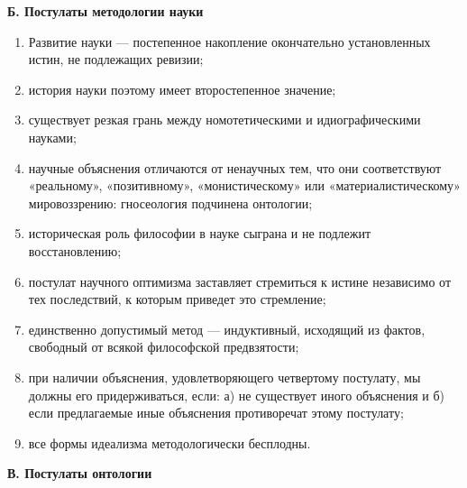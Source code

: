 \begin{center}
  \textbf{Б. Постулаты методологии науки}
\end{center}

\begin{enumerate}

  \item Развитие науки --- постепенное накопление окончательно
        установленных истин, не подлежащих ревизии;

  \item история науки поэтому имеет второстепенное значение;

  \item существует резкая грань между номотетическими и
        идиографическими науками;

  \item научные объяснения отличаются от ненаучных тем, что они
        соответствуют «реальному», «позитивному», «монистическому»
        или «материалистическому» мировоззрению: гносеология
        подчинена онтологии;

  \item историческая роль философии в науке сыграна и не подлежит
        восстановлению;

  \item постулат научного оптимизма заставляет стремиться к истине
        независимо от тех последствий, к которым приведет это
        стремление;

  \item единственно допустимый метод --- индуктивный, исходящий из
        фактов, свободный от всякой философской предвзятости;

  \item при наличии объяснения, удовлетворяющего четвертому
        постулату, мы должны его придерживаться, если: а) не
        существует иного объяснения и б) если предлагаемые иные
        объяснения противоречат этому постулату;

  \item все формы идеализма методологически бесплодны.

\end{enumerate}

\begin{center}

  \textbf{В. Постулаты онтологии}

\end{center}

